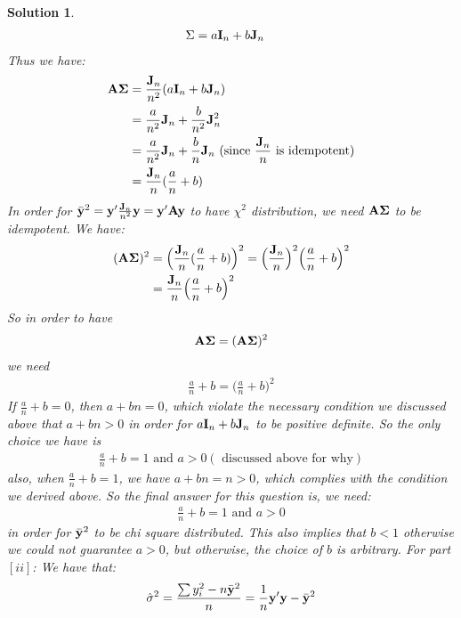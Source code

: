 \documentclass[11pt]{article}
\newtheorem{sol}{Solution}
\begin{document}
\begin{sol}
\begin{align*}
		\Sigma &= a{\bf I}_n + b{\bf J}_n
	\end{align*}
	Thus we have:
	\begin{align*}
		{\bf A}{\bf \Sigma} &= \frac{{\bf J}_n}{n^2}(a{\bf I}_n + b{\bf J}_n)\\
		&= \frac{a}{n^2}{\bf J}_n + \frac{b}{n^2}{\bf J}_n^2\\
		&= \frac{a}{n^2}{\bf J}_n + \frac{b}{n}{\bf J}_n \text{ (since }\frac{{\bf J}_n}{n} \text{ is idempotent})\\
		&= \frac{{\bf J}_n}{n}(\frac{a}{n} + b)
	\end{align*}
	In order for $\bar{{\bf y}}^2 ={\bf y}'\frac{{\bf J}_n}{n^2}{\bf y} = {\bf y}'{\bf A}{\bf y} $ to have $\chi^2$ distribution, we need ${\bf A}{\bf \Sigma}$ to be idempotent. \vskip 2mm
	We have:
	\begin{align*}
		({\bf A}{\bf \Sigma})^2 &= \Big(\frac{{\bf J}_n}{n}(\frac{a}{n} + b)\Big)^2= \Big(\frac{{\bf J}_n}{n}\Big)^2\Big(\frac{a}{n} + b\Big)^2\\
		&= \frac{{\bf J}_n}{n}\Big(\frac{a}{n} + b\Big)^2
	\end{align*}
	So in order to have 
	\begin{align*}
		{\bf A}{\bf \Sigma} = ({\bf A}{\bf \Sigma})^2
	\end{align*}
	we need
	\begin{align*}
		\frac{a}{n} + b = \Big(\frac{a}{n} + b\Big)^2
	\end{align*}
	If $\frac{a}{n} + b = 0$, then $a + bn = 0$, which violate the necessary condition we discussed above that $a + bn > 0$ in order for $a{\bf I}_n +b{\bf J}_n$ to be positive definite.\vskip 2mm
	So the only choice we have is
	\begin{align*}
		\frac{a}{n} + b = 1 \text{ and } a > 0 (\text{ discussed above for why})
	\end{align*}
	also, when $\frac{a}{n} + b = 1$, we have $a + bn = n > 0$, which complies with the condition we derived above.\vskip 2mm
	So the final answer for this question is, we need:
	\begin{align*}
		\frac{a}{n} + b = 1 \text{ and } a > 0
	\end{align*}
	 in order for $\bar{{\bf y}}^2$ to be chi square distributed. This also implies that $b < 1$ otherwise we could not guarantee $a > 0$, but otherwise, the choice of $b$ is arbitrary.\vskip 2mm
	For part $[ii]$:\vskip 2mm
	We have that:
	\begin{align*}
		\hat{\sigma}^2 &= \frac{\sum y_i^2 - n\bar{{\bf y}}^2}{n} = \frac{1}{n}{\bf y}'{\bf y} - \bar{{\bf y}}^2\\

\end{align*}
\end{sol}
\end{document}
